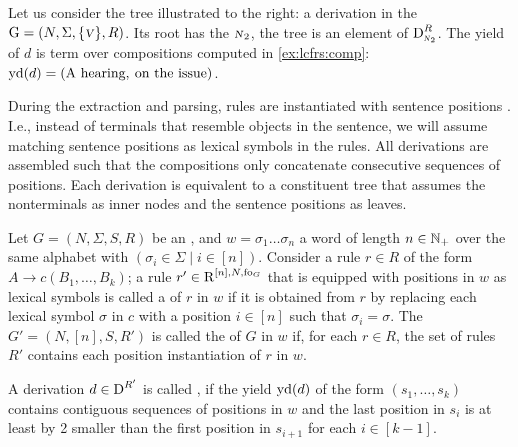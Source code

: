 \documentclass[../../document.tex]{subfiles}
\begin{document}
    \begin{wrapfigure}[6]{r}{0pt}
    \end{wrapfigure}
    \label{ex:lcfrs:deriv}
    Let us consider the tree illustrated to the right: a derivation in the  \(\mathrm{G} = (N, \Sigma, \{\textsc{\textsl{v}}\}, R)\).
    Its root has the  \(\textsc{\textsl{n}}_2\), the tree is an element of \(\operatorname{D}^R_{\textsc{\textsl{n}}_2}\).
    The yield of \(d\) is term over compositions computed in \cref{ex:lcfrs:comp}: \(\operatorname{yd}(d) = (\text{A hearing}, \: \text{on the issue})\).
    \exampleqed

    \vspace{\baselineskip}

    During the extraction and parsing,  rules are instantiated with sentence positions \citep[Definition~6.8]{Kal10}.
    I.e., instead of terminals that resemble objects in the sentence, we will assume matching sentence positions as lexical symbols in the rules.
    All derivations are assembled such that the compositions only concatenate consecutive sequences of positions.
    Each derivation is equivalent to a constituent tree that assumes the  nonterminals as inner nodes and the sentence positions as leaves.

    \begin{definition}
        Let \(G = (N, \varSigma, S, R)\) be an , and \(w = \sigma_1 \ldots \sigma_n\) a word of length \(n \in \mathbb{N}_+\) over the same alphabet with \((\sigma_i \in \varSigma \mid i \in [n])\).
        Consider a rule \(r\in R\) of the form \(A \to c (B_1, \ldots, B_k)\); a rule \(r' \in \operatorname{R}^{[n],N,\operatorname{fo}_G}\) that is equipped with positions in \(w\) as lexical symbols is called a  of \(r\) in \(w\) if it is obtained from \(r\) by replacing each lexical symbol \(\sigma\) in \(c\) with a position \(i \in [n]\) such that \(\sigma_i = \sigma\).
        The  \(G' = (N, [n], S, R')\) is called the  of \(G\) in \(w\) if, for each \(r \in R\), the set of rules \(R'\) contains each position instantiation of \(r\) in \(w\).

        A derivation \(d \in \operatorname{D}^{R'}\) is called , if the yield \(\operatorname{yd}(d)\) of the form \((s_1, \ldots, s_k)\) contains contiguous sequences of positions in \(w\) and the last position in \(s_i\) is at least by 2 smaller than the first position in \(s_{i+1}\) for each \(i \in [k-1]\).
    \end{definition}
\end{document}
